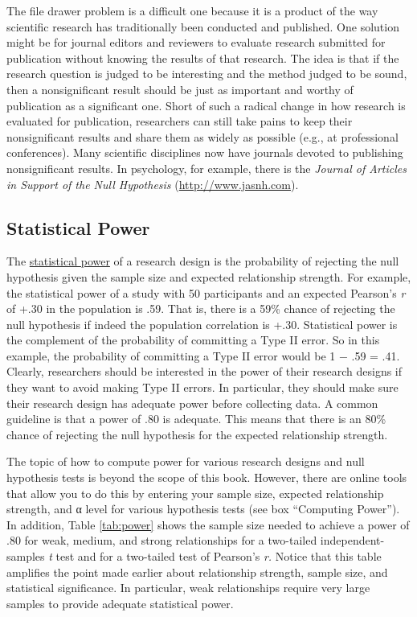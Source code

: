 \documentclass[
]{krantz}
\begin{document}
The file drawer problem is a difficult one because it is a product of the way scientific research has traditionally been conducted and published. One solution might be for journal editors and reviewers to evaluate research submitted for publication without knowing the results of that research. The idea is that if the research question is judged to be interesting and the method judged to be sound, then a nonsignificant result should be just as important and worthy of publication as a significant one. Short of such a radical change in how research is evaluated for publication, researchers can still take pains to keep their nonsignificant results and share them as widely as possible (e.g., at professional conferences). Many scientific disciplines now have journals devoted to publishing nonsignificant results. In psychology, for example, there is the \emph{Journal of Articles in Support of the Null Hypothesis} (\url{http://www.jasnh.com}).

\hypertarget{statistical-power}{%
\subsection*{Statistical Power}\label{statistical-power}}


The \protect\hyperlink{statistical-power-1}{statistical power} of a research design is the probability of rejecting the null hypothesis given the sample size and expected relationship strength. For example, the statistical power of a study with 50 participants and an expected Pearson's \emph{r} of +.30 in the population is .59. That is, there is a 59\% chance of rejecting the null hypothesis if indeed the population correlation is +.30. Statistical power is the complement of the probability of committing a Type II error. So in this example, the probability of committing a Type II error would be 1 − .59 = .41. Clearly, researchers should be interested in the power of their research designs if they want to avoid making Type II errors. In particular, they should make sure their research design has adequate power before collecting data. A common guideline is that a power of .80 is adequate. This means that there is an 80\% chance of rejecting the null hypothesis for the expected relationship strength.

The topic of how to compute power for various research designs and null hypothesis tests is beyond the scope of this book. However, there are online tools that allow you to do this by entering your sample size, expected relationship strength, and α level for various hypothesis tests (see box ``Computing Power''). In addition, Table \ref{tab:power} shows the sample size needed to achieve a power of .80 for weak, medium, and strong relationships for a two-tailed independent-samples \emph{t} test and for a two-tailed test of Pearson's \emph{r.} Notice that this table amplifies the point made earlier about relationship strength, sample size, and statistical significance. In particular, weak relationships require very large samples to provide adequate statistical power.
\end{document}
